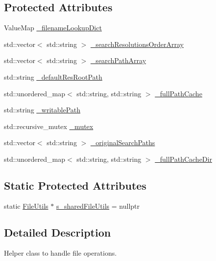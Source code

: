 \subsection*{Protected Attributes}
\begin{DoxyCompactItemize}
\item 
Value\+Map \hyperlink{classFileUtils_a3d6f18571f845268f614048092f74c76}{\+\_\+filename\+Lookup\+Dict}
\item 
std\+::vector$<$ std\+::string $>$ \hyperlink{classFileUtils_a35a01013ca9bcbb04c7ae1cd43fbe572}{\+\_\+search\+Resolutions\+Order\+Array}
\item 
std\+::vector$<$ std\+::string $>$ \hyperlink{classFileUtils_a856a6d415b5bca3399d826e13ce23501}{\+\_\+search\+Path\+Array}
\item 
std\+::string \hyperlink{classFileUtils_a50cd93b75a8864395a6693263152f876}{\+\_\+default\+Res\+Root\+Path}
\item 
std\+::unordered\+\_\+map$<$ std\+::string, std\+::string $>$ \hyperlink{classFileUtils_a65bd3009aa5816155b0718744aacdf75}{\+\_\+full\+Path\+Cache}
\item 
std\+::string \hyperlink{classFileUtils_a58acf8f0cf86958ed5a6975363b3abe5}{\+\_\+writable\+Path}
\item 
std\+::recursive\+\_\+mutex \hyperlink{classFileUtils_a5a756383861bc8cf5058ac4253d269d7}{\+\_\+mutex}
\item 
std\+::vector$<$ std\+::string $>$ \hyperlink{classFileUtils_a1bd4771548f29716b5897cd7d4cc82f1}{\+\_\+original\+Search\+Paths}
\item 
std\+::unordered\+\_\+map$<$ std\+::string, std\+::string $>$ \hyperlink{classFileUtils_a1692ddcf7df153c024bfc3f0a3756fd8}{\+\_\+full\+Path\+Cache\+Dir}
\end{DoxyCompactItemize}
\subsection*{Static Protected Attributes}
\begin{DoxyCompactItemize}
\item 
static \hyperlink{classFileUtils}{File\+Utils} $\ast$ \hyperlink{classFileUtils_aa5350a22566d3f1ca9b0e5bd1e088166}{s\+\_\+shared\+File\+Utils} = nullptr
\end{DoxyCompactItemize}


\subsection{Detailed Description}
Helper class to handle file operations. 

